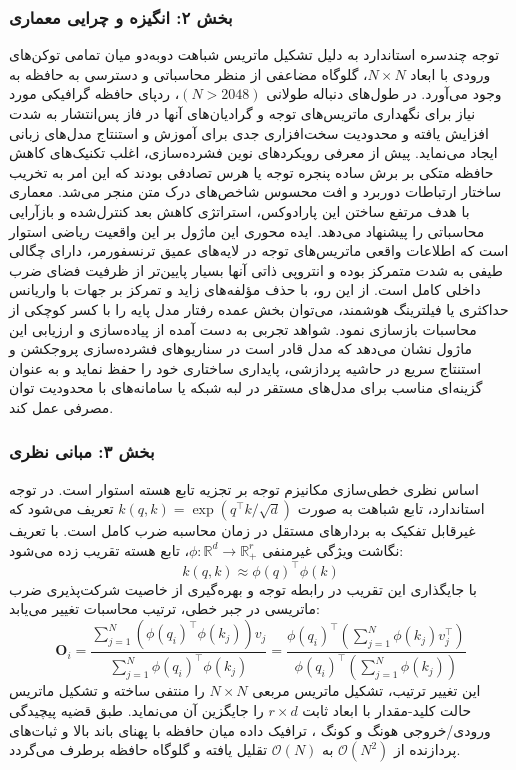 \subsubsection*{بخش ۲: انگیزه و چرایی معماری }
توجه چندسره استاندارد  به دلیل تشکیل ماتریس شباهت دو‌به‌دو میان تمامی توکن‌های ورودی با ابعاد $N \times N$، گلوگاه مضاعفی از منظر محاسباتی و دسترسی به حافظه به وجود می‌آورد. در طول‌های دنباله طولانی $(N > 2048)$، ردپای حافظه گرافیکی مورد نیاز برای نگهداری ماتریس‌های توجه و گرادیان‌های آنها در فاز پس‌انتشار به شدت افزایش یافته و محدودیت سخت‌افزاری جدی برای آموزش و استنتاج مدل‌های زبانی ایجاد می‌نماید.
پیش از معرفی رویکردهای نوین فشرده‌سازی، اغلب تکنیک‌های کاهش حافظه متکی بر برش ساده پنجره توجه  یا هرس تصادفی بودند که این امر به تخریب ساختار ارتباطات دوربرد و افت محسوس شاخص‌های درک متن منجر می‌شد. معماری  با هدف مرتفع ساختن این پارادوکس، استراتژی کاهش بعد کنترل‌شده و بازآرایی محاسباتی را پیشنهاد می‌دهد.
ایده محوری این ماژول بر این واقعیت ریاضی استوار است که اطلاعات واقعی ماتریس‌های توجه در لایه‌های عمیق ترنسفورمر، دارای چگالی طیفی به شدت متمرکز بوده و انتروپی ذاتی آنها بسیار پایین‌تر از ظرفیت فضای ضرب داخلی کامل است. از این رو، با حذف مؤلفه‌های زاید و تمرکز بر جهات با واریانس حداکثری یا فیلترینگ هوشمند، می‌توان بخش عمده رفتار مدل پایه را با کسر کوچکی از محاسبات بازسازی نمود.
شواهد تجربی به دست آمده از پیاده‌سازی و ارزیابی این ماژول نشان می‌دهد که مدل قادر است در سناریوهای فشرده‌سازی پروجکشن و استنتاج سریع در حاشیه پردازشی، پایداری ساختاری خود را حفظ نماید و به عنوان گزینه‌ای مناسب برای مدل‌های مستقر در لبه شبکه یا سامانه‌های با محدودیت توان مصرفی عمل کند.

\subsubsection*{بخش ۳: مبانی نظری }
اساس نظری خطی‌سازی مکانیزم توجه بر تجزیه تابع هسته  استوار است. در توجه استاندارد، تابع شباهت به صورت $k(q, k) = \exp(q^\top k / \sqrt{d})$ تعریف می‌شود که غیرقابل تفکیک به بردارهای مستقل در زمان محاسبه ضرب کامل است. با تعریف نگاشت ویژگی غیرمنفی $\phi: \mathbb{R}^d \to \mathbb{R}^r_+$، تابع هسته تقریب زده می‌شود:
\begin{equation}
k(q, k) \approx \phi(q)^\top \phi(k)
\end{equation}
با جایگذاری این تقریب در رابطه توجه و بهره‌گیری از خاصیت شرکت‌پذیری  ضرب ماتریسی در جبر خطی، ترتیب محاسبات تغییر می‌یابد:
\begin{equation}
\mathbf{O}_i = \frac{\sum_{j=1}^N (\phi(q_i)^\top \phi(k_j)) v_j}{\sum_{j=1}^N \phi(q_i)^\top \phi(k_j)} = \frac{\phi(q_i)^\top \left( \sum_{j=1}^N \phi(k_j) v_j^\top \right)}{\phi(q_i)^\top \left( \sum_{j=1}^N \phi(k_j) \right)}
\end{equation}
این تغییر ترتیب، تشکیل ماتریس مربعی $N \times N$ را منتفی ساخته و تشکیل ماتریس حالت کلید-مقدار با ابعاد ثابت $r \times d$ را جایگزین آن می‌نماید. طبق قضیه پیچیدگی ورودی/خروجی هونگ و کونگ ، ترافیک داده میان حافظه با پهنای باند بالا  و ثبات‌های پردازنده از $\mathcal{O}(N^2)$ به $\mathcal{O}(N)$ تقلیل یافته و گلوگاه حافظه برطرف می‌گردد.

